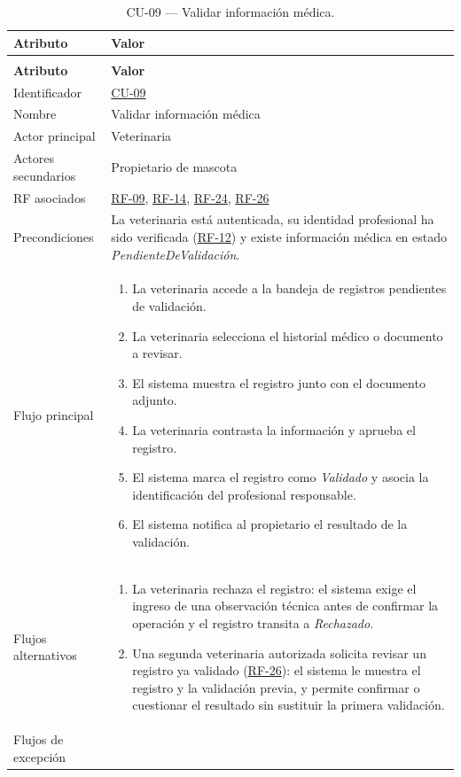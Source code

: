 \documentclass[journal,onecolumn]{IEEEtran}
\makeatletter
\newenvironment{atributos}[2]{%
	\small
	\begin{longtable}{@{}>{\raggedright\arraybackslash}p{4.2cm} >{\raggedright\arraybackslash}p{11.2cm}@{}}
		\caption{#2}\label{tab:#1}\\
		\toprule
		\textbf{Atributo} & \textbf{Valor} \\
		\midrule
		\endfirsthead
		\multicolumn{2}{@{}l}{\small\itshape (continuación)}\\
		\toprule
		\textbf{Atributo} & \textbf{Valor} \\
		\midrule
		\endhead
		\bottomrule
		\endlastfoot
	}{%
	\end{longtable}
	\normalsize
}
\makeatother
\begin{document}
	\begin{atributos}{CU-09}{CU-09 --- Validar información médica.}
		Identificador & \hyperref[tab:CU-09]{CU-09} \\
		Nombre & Validar información médica \\
		Actor principal & Veterinaria \\
		Actores secundarios & Propietario de mascota \\
		RF asociados & \hyperref[tab:RF-09]{RF-09}, \hyperref[tab:RF-14]{RF-14}, \hyperref[tab:RF-24]{RF-24}, \hyperref[tab:RF-26]{RF-26} \\
		Precondiciones & La veterinaria está autenticada, su identidad profesional ha sido verificada (\hyperref[tab:RF-12]{RF-12}) y existe información médica en estado \emph{PendienteDeValidación}. \\
		Flujo principal &
		\begin{enumerate}[leftmargin=*, nosep]
			\item La veterinaria accede a la bandeja de registros pendientes de validación.
			\item La veterinaria selecciona el historial médico o documento a revisar.
			\item El sistema muestra el registro junto con el documento adjunto.
			\item La veterinaria contrasta la información y aprueba el registro.
			\item El sistema marca el registro como \emph{Validado} y asocia la identificación del profesional responsable.
			\item El sistema notifica al propietario el resultado de la validación.
		\end{enumerate} \\
		Flujos alternativos &
		\begin{enumerate}[leftmargin=*, nosep]
			\item[4.1] La veterinaria rechaza el registro: el sistema exige el ingreso de una observación técnica antes de confirmar la operación y el registro transita a \emph{Rechazado}.
			\item[5.1] Una segunda veterinaria autorizada solicita revisar un registro ya validado (\hyperref[tab:RF-26]{RF-26}): el sistema le muestra el registro y la validación previa, y permite confirmar o cuestionar el resultado sin sustituir la primera validación.
		\end{enumerate} \\
		Flujos de excepción &
		\begin{enumerate}[leftmargin=*, nosep]

\end{enumerate}
\end{atributos}
\end{document}
